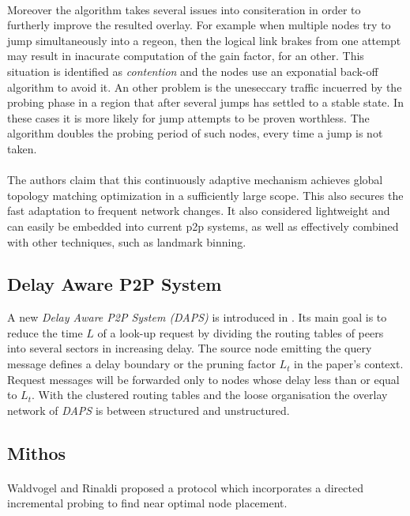 \documentclass[a4paper,10pt]{article}
\begin{document}
\paragraph{}
Moreover the algorithm takes several issues into consiteration in order to furtherly improve the resulted overlay. For example when multiple nodes try to jump simultaneously into a regeon, then the logical link brakes from one attempt may result in inacurate computation of the gain factor, for an other. This situation is identified as \emph{contention} and the nodes use an exponatial back-off algorithm to avoid it. An other problem is the uneseccary traffic incuerred by the probing phase in a region that after several jumps has settled to a stable state. In these cases it is more likely for jump attempts to be proven worthless. The algorithm doubles the probing period of such nodes, every time a jump is not taken.

\paragraph{}
The authors claim that this continuously adaptive mechanism achieves global topology matching optimization in a sufficiently large scope. This also secures the fast adaptation to frequent network changes. It also considered lightweight and can easily be embedded into current p2p systems, as well as effectively combined with other techniques, such as landmark binning.

\subsection{Delay Aware P2P System}
A new \emph{Delay Aware P2P System (DAPS)} is introduced in \cite{zhang_daps_2005}. Its main goal is to reduce the time $L$ of a look-up request by dividing the routing tables of peers into several sectors in increasing delay. The source node emitting the query message defines a delay boundary or the pruning factor $L_t$ in the paper's context. Request messages will be forwarded only to nodes whose delay less than or equal to $L_t$. With the clustered routing tables and the loose organisation the overlay network of \emph{DAPS} is between structured and unstructured.

\subsection{Mithos}

\paragraph{}
Waldvogel and Rinaldi proposed a protocol\cite{waldvogel_mythos_2003} which incorporates a directed incremental probing to find near optimal node placement.
\end{document}
